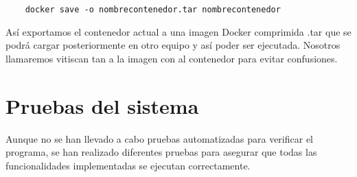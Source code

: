 \begin{verbatim}
    docker save -o nombrecontenedor.tar nombrecontenedor
\end{verbatim}


Así exportamos el contenedor actual a una imagen Docker comprimida .tar que se podrá cargar posteriormente en otro equipo y así poder ser ejecutada.
Nosotros llamaremos vitiscan tan a la imagen con al contenedor para evitar confusiones.

\section{Pruebas del sistema}
Aunque no se han llevado a cabo pruebas automatizadas para verificar el programa, se han realizado diferentes pruebas para asegurar que todas las funcionalidades implementadas se ejecutan correctamente.